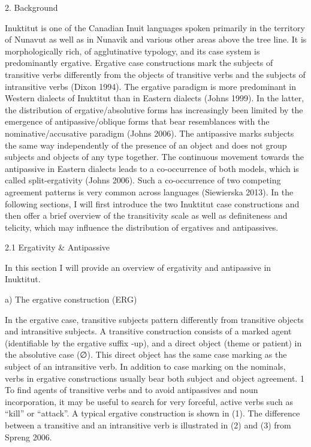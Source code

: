 \documentclass[12pt]{article}
\begin{document}
2. Background

Inuktitut is one of the Canadian Inuit languages spoken primarily in the territory of Nunavut as well as in Nunavik and various other areas above the tree line. It is morphologically rich, of agglutinative typology, and its case system is predominantly ergative. Ergative case constructions mark the subjects of transitive verbs differently from the objects of transitive verbs and the subjects of intransitive verbs (Dixon 1994). 
The ergative paradigm is more predominant in Western dialects of Inuktitut than in Eastern dialects (Johns 1999). In the latter, the distribution of ergative/absolutive forms has increasingly been limited by the emergence of antipassive/oblique forms that bear resemblances with the nominative/accusative paradigm (Johns 2006). The antipassive marks subjects the same way independently of the presence of an object and does not group subjects and objects of any type together. The continuous movement towards the antipassive in Eastern dialects leads to a co-occurrence of both models, which is called split-ergativity (Johns 2006). Such a co-occurrence of two competing agreement patterns is very common across languages (Siewierska 2013). 
In the following sections, I will first introduce the two Inuktitut case constructions and then offer a brief overview of the transitivity scale as well as definiteness and telicity, which may influence the distribution of ergatives and antipassives. 

2.1 Ergativity & Antipassive

In this section I will provide an overview of ergativity and antipassive in Inuktitut.

a) The ergative construction (ERG)

In the ergative case, transitive subjects pattern differently from transitive objects and intransitive subjects. A transitive construction consists of a marked agent (identifiable by the ergative suffix -up), and a direct object (theme or patient) in the absolutive case (∅). This direct object has the same case marking as the subject of an intransitive verb. In addition to case marking on the nominals, verbs in ergative constructions usually bear both subject and object agreement. 1
To find agents of transitive verbs and to avoid antipassives and noun incorporation, it may be useful to search for very forceful, active verbs such as “kill” or “attack”. A typical ergative construction is shown in (1). The difference between a transitive and an intransitive verb is illustrated in (2) and (3) from Spreng 2006.
\end{document}
